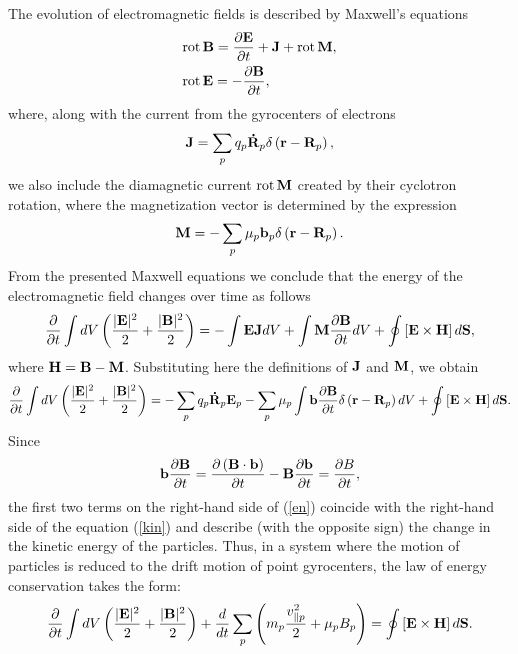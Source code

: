 \documentclass[final,3p]{elsarticle}
\newcommand{\rot}{\mbox{\rm{rot\,}}}
\begin{document}
The evolution of electromagnetic fields is described by Maxwell's equations
\begin{align}
	&\rot {\bf B}=\frac{\partial {\bf E}}{\partial t}+{\bf J} +\rot {\bf M}, \\
	&\rot {\bf E}=-\frac{\partial {\bf B}}{\partial t},
\end{align}
where, along with the current from the gyrocenters of electrons
\begin{equation}
	{\bf J}=\sum\limits_{p} q_p {\bf \dot{R}}_p \delta\left({\bf r}-{\bf R}_p\right),	
	\end{equation}
we also include the diamagnetic current $\rot {\bf M}$ created by their cyclotron rotation, where the magnetization vector is determined by the expression
\begin{equation}
	{\bf M}=-\sum\limits_p \mu_p {\bf b}_p \delta\left({\bf r}-{\bf R}_p\right).
\end{equation}
From the presented Maxwell equations we conclude that the energy of the electromagnetic field changes over time as follows
\begin{equation}
	\frac{\partial}{\partial t}\int dV\left(\frac{|{\bf E}|^2}{2}+\frac{|{\bf B}|^2}{2}\right)=-\int {\bf E}{\bf J} dV + \int {\bf M} \frac{\partial {\bf B}}{\partial t} dV+\oint \left[{\bf E}\times {\bf H}\right] d{\bf S},
\end{equation}
where ${\bf H}={\bf B}-{\bf M}$. Substituting here the definitions of ${\bf J}$ and ${\bf M}$, we obtain
\begin{equation}\label{en}
	\frac{\partial}{\partial t}\int dV\left(\frac{|{\bf E}|^2}{2}+\frac{|{\bf B}|^2}{2}\right)=-\sum\limits_p q_p {\bf \dot{R}}_p {\bf E}_p - \sum\limits_p \mu_p\int {\bf b} \frac{\partial {\bf B}}{\partial t} \delta\left({\bf r}-{\bf R}_p\right) dV+\oint \left[{\bf E}\times {\bf H}\right] d{\bf S}.
\end{equation}
Since 
\begin{equation}
	{\bf b}\frac{\partial {\bf B}}{\partial t}=\frac{\partial \left({\bf B}\cdot{\bf b}\right)}{\partial t}-{\bf B}\frac{\partial {\bf b}}{\partial t}=\frac{\partial B}{\partial t},
\end{equation}
the first two terms on the right-hand side of (\ref{en}) coincide with the right-hand side of the equation (\ref{kin}) and describe (with the opposite sign) the change in the kinetic energy of the particles.  Thus, in a system where the motion of particles is reduced to the drift motion of point gyrocenters, the law of energy conservation takes the form:
\begin{equation}
	\frac{\partial}{\partial t}\int dV\left(\frac{|{\bf E}|^2}{2}+\frac{|{\bf B}|^2}{2}\right)+\frac{d}{dt}\sum\limits_p \left(m_p \frac{v_{\|p}^2}{2}+\mu_p B_p\right) =\oint \left[{\bf E}\times {\bf H}\right] d{\bf S}.
\end{equation}
\end{document}
